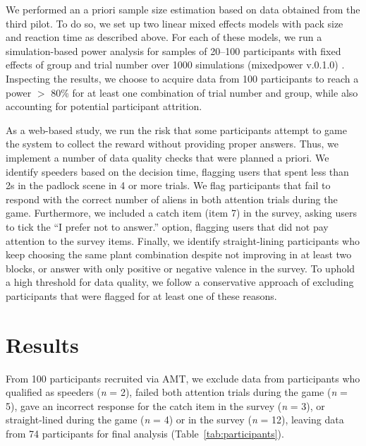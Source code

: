 We performed an a priori sample size estimation based on data obtained from the third pilot. 
To do so, we set up two linear mixed effects models with pack size and reaction time as described above. 
For each of these models, we run a simulation-based power analysis for samples of 20--100 participants with fixed effects of group and trial number over 1000 simulations (mixedpower v.0.1.0) \citep{kumle_estimating_2021}. 
Inspecting the results, we choose to acquire data from 100 participants to reach a power $>$ 80\% for at least one combination of trial number and group, while also accounting for potential participant attrition.

As a web-based study, we run the risk that some participants attempt to game the system to collect the reward without providing proper answers. 
Thus, we implement a number of data quality checks that were planned a priori.
We identify speeders based on the decision time, flagging users that spent less than 2s in the padlock scene in 4 or more trials.
We flag participants that fail to respond with the correct number of aliens in both attention trials during the game.
Furthermore, we included a catch item (item 7) in the survey, asking users to tick the ``I prefer not to answer.'' option, flagging users that did not pay attention to the survey items.
Finally, we identify straight-lining participants who keep choosing the same plant combination despite not improving in at least two blocks, or answer with only positive or negative valence in the survey.
To uphold a high threshold for data quality, we follow a conservative approach of excluding participants that were flagged for at least one of these reasons.

\section{Results}\label{sec:results}

From 100 participants recruited via \gls{AMT}, we exclude data from participants who qualified as speeders (\textit{n} = 2), failed both attention trials during the game (\textit{n} = 5), gave an incorrect response for the catch item in the survey (\textit{n} = 3), or straight-lined during the game (\textit{n} = 4) or in the survey (\textit{n} = 12), leaving data from 74 participants for final analysis (Table~\ref{tab:participants}).

